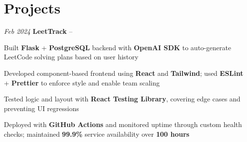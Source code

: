 \section{Projects}

\begin{twocolentry}{
    \textit{Feb 2024}
}{
    \textbf{LeetTrack} -- 
}
\end{twocolentry}
\begin{onecolentry}
    \begin{highlights}
        \item Built \textbf{Flask} + \textbf{PostgreSQL} backend with \textbf{OpenAI SDK} to auto-generate LeetCode solving plans based on user history
        \item Developed component-based frontend using \textbf{React} and \textbf{Tailwind}; used \textbf{ESLint} + \textbf{Prettier} to enforce style and enable team scaling
        \item Tested logic and layout with \textbf{React Testing Library}, covering edge cases and preventing UI regressions
        \item Deployed with \textbf{GitHub Actions} and monitored uptime through custom health checks; maintained \textbf{99.9\%} service availability over \textbf{100 hours}
    \end{highlights}
\end{onecolentry}
